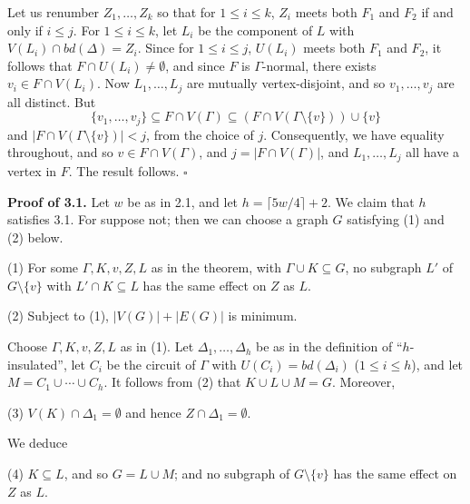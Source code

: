 Let us renumber $Z_1, \ldots, Z_k$ so that for $1 \le i \le k$, $Z_i$ meets both $F_1$ and $F_2$ if and only if $i \le j$. For $1 \le i \le k$, let $L_i$ be the component of $L$ with $V(L_i) \cap bd(\Delta) = Z_i$. Since for $1 \le i \le j$, $U(L_i)$ meets both $F_1$ and $F_2$, it follows that $F \cap U(L_i) \ne \emptyset$, and since $F$ is $\Gamma$-normal, there exists $v_i \in F \cap V(L_i)$. Now $L_1, \ldots, L_j$ are mutually vertex-disjoint, and so $v_1, \ldots, v_j$ are all distinct. But
\begin{equation*}
\{v_1, \ldots, v_j\} \subseteq F \cap V(\Gamma) \subseteq (F \cap V(\Gamma \setminus \{v\})) \cup \{v\}
\end{equation*}
and $|F \cap V(\Gamma \setminus \{v\})| < j$, from the choice of $j$. Consequently, we have equality throughout, and so $v \in F \cap V(\Gamma)$, and $j = |F \cap V(\Gamma)|$, and $L_1, \ldots, L_j$ all have a vertex in $F$. The result follows. $\square$

\textbf{Proof of 3.1.} Let $w$ be as in 2.1, and let $h = \lceil 5w/4 \rceil + 2$. We claim that $h$ satisfies 3.1. For suppose not; then we can choose a graph $G$ satisfying (1) and (2) below.

\hspace*{12pt}(1) For some $\Gamma, K, v, Z, L$ as in the theorem, with $\Gamma \cup K \subseteq G$, no subgraph $L'$ of $G \setminus \{v\}$ with $L' \cap K \subseteq L$ has the same effect on $Z$ as $L$.

\hspace*{12pt}(2) Subject to (1), $|V(G)| + |E(G)|$ is minimum.

Choose $\Gamma, K, v, Z, L$ as in (1). Let $\Delta_1, \ldots, \Delta_h$ be as in the definition of ``$h$-insulated'', let $C_i$ be the circuit of $\Gamma$ with $U(C_i) = bd(\Delta_i)$ ($1 \le i \le h$), and let $M = C_1 \cup \cdots \cup C_h$. It follows from (2) that $K \cup L \cup M = G$. Moreover,

\hspace*{12pt}(3) $V(K) \cap \Delta_1 = \emptyset$ and hence $Z \cap \Delta_1 = \emptyset$.

We deduce

\hspace*{12pt}(4) $K \subseteq L$, and so $G = L \cup M$; and no subgraph of $G \setminus \{v\}$ has the same effect on $Z$ as $L$.
